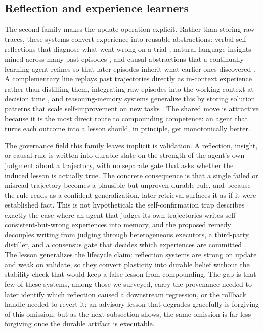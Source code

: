 \subsection{Reflection and experience learners}

The second family makes the update operation explicit. Rather than storing raw traces, these systems convert experience into reusable abstractions: verbal self-reflections that diagnose what went wrong on a trial \citep{shinn2023reflexionlanguageagentsverbal}, natural-language insights mined across many past episodes \citep{zhao2024expelllmagentsexperiential}, and causal abstractions that a continually learning agent refines so that later episodes inherit what earlier ones discovered \citep{majumder2023clincontinuallylearninglanguage}. A complementary line replays past trajectories directly as in-context experience rather than distilling them, integrating raw episodes into the working context at decision time \citep{liu2025contextualexperiencereplay}, and reasoning-memory systems generalize this by storing solution patterns that scale self-improvement on new tasks \citep{ouyang2025reasoningbank}. The shared move is attractive because it is the most direct route to compounding competence: an agent that turns each outcome into a lesson should, in principle, get monotonically better.

The governance field this family leaves implicit is validation. A reflection, insight, or causal rule is written into durable state on the strength of the agent's own judgment about a trajectory, with no separate gate that asks whether the induced lesson is actually true. The concrete consequence is that a single failed or misread trajectory becomes a plausible but unproven durable rule, and because the rule reads as a confident generalization, later retrieval surfaces it as if it were established fact. This is not hypothetical: the self-confirmation trap describes exactly the case where an agent that judges its own trajectories writes self-consistent-but-wrong experiences into memory, and the proposed remedy decouples writing from judging through heterogeneous executors, a third-party distiller, and a consensus gate that decides which experiences are committed \citep{zhu2026selfconfirmation}. The lesson generalizes the lifecycle claim: reflection systems are strong on update and weak on validate, so they convert plasticity into durable belief without the stability check that would keep a false lesson from compounding. The gap is that few of these systems, among those we surveyed, carry the provenance needed to later identify which reflection caused a downstream regression, or the rollback handle needed to revert it; an advisory lesson that degrades gracefully is forgiving of this omission, but as the next subsection shows, the same omission is far less forgiving once the durable artifact is executable.

